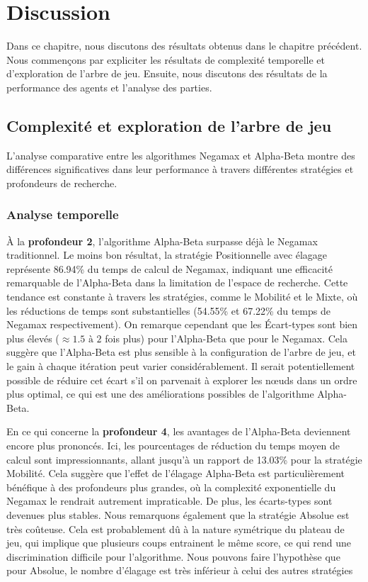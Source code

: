 \chapter{Discussion}
\label{chap:discussion}

Dans ce chapitre, nous discutons des résultats obtenus dans le chapitre précédent. Nous commençons par expliciter les résultats de complexité temporelle et d'exploration de l'arbre de jeu. Ensuite, nous discutons des résultats de la performance des agents et l'analyse des parties.

\section{Complexité et exploration de l'arbre de jeu}
L'analyse comparative entre les algorithmes Negamax et Alpha-Beta montre des différences significatives dans leur performance à travers différentes stratégies et profondeurs de recherche.

\subsection{Analyse temporelle}
À la \textbf{profondeur 2}, l'algorithme Alpha-Beta surpasse déjà le Negamax traditionnel. Le moins bon résultat, la  stratégie Positionnelle avec élagage représente 86.94\% du temps de calcul de Negamax, indiquant une efficacité remarquable de l'Alpha-Beta dans la limitation de l'espace de recherche. Cette tendance est constante à travers les stratégies, comme le Mobilité et le Mixte, où les réductions de temps sont substantielles (54.55\% et 67.22\% du temps de Negamax respectivement). On remarque cependant que les Écart-types sont bien plus élevés ($\approx 1.5 \,\, \text{à} \,\, 2$ fois plus) pour l'Alpha-Beta que pour le Negamax. Cela suggère que l'Alpha-Beta est plus sensible à la configuration de l'arbre de jeu, et le gain à chaque itération peut varier considérablement. Il serait potentiellement possible de réduire cet écart s'il on parvenait à explorer les nœuds dans un ordre plus optimal, ce qui est une des améliorations possibles de l'algorithme Alpha-Beta.

En ce qui concerne la \textbf{profondeur 4}, les avantages de l'Alpha-Beta deviennent encore plus prononcés. Ici, les pourcentages de réduction du temps moyen de calcul sont impressionnants, allant jusqu'à un rapport de 13.03\% pour la stratégie Mobilité. Cela suggère que l'effet de l'élagage Alpha-Beta est particulièrement bénéfique à des profondeurs plus grandes, où la complexité exponentielle du Negamax le rendrait autrement impraticable. De plus, les écarts-types sont devenues plus stables. Nous remarquons également que la stratégie Absolue est très coûteuse. Cela est probablement dû à la nature symétrique du plateau de jeu, qui implique que plusieurs coups entrainent le même score, ce qui rend une discrimination difficile pour l'algorithme. Nous pouvons faire l'hypothèse que pour Absolue, le nombre d'élagage est très inférieur à celui des autres stratégies

